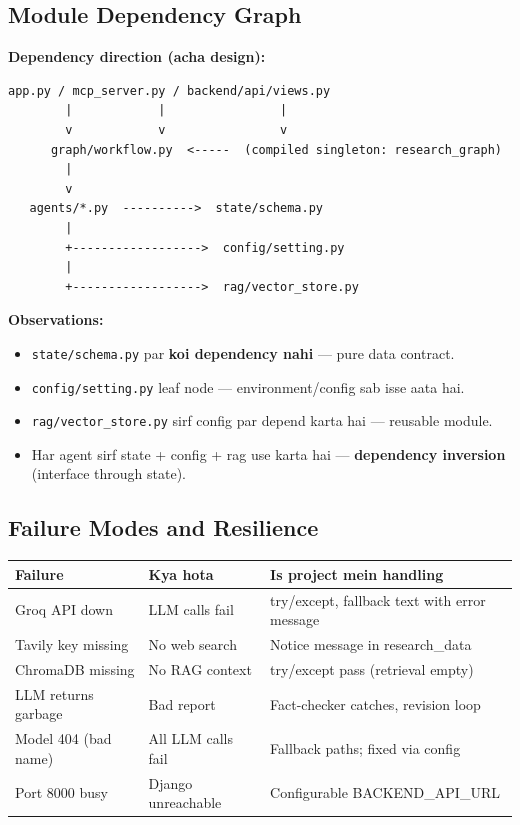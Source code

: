 \subsection{Module Dependency Graph}

\begin{conceptbox}
\textbf{Dependency direction (acha design):}

\begin{lstlisting}[style=envstyle]
app.py / mcp_server.py / backend/api/views.py
        |            |                |
        v            v                v
      graph/workflow.py  <-----  (compiled singleton: research_graph)
        |
        v
   agents/*.py  ---------->  state/schema.py
        |
        +------------------>  config/setting.py
        |
        +------------------>  rag/vector_store.py
\end{lstlisting}

\textbf{Observations:}
\begin{itemize}
\item \texttt{state/schema.py} par \textbf{koi dependency nahi} --- pure data contract.
\item \texttt{config/setting.py} leaf node --- environment/config sab isse aata hai.
\item \texttt{rag/vector\_store.py} sirf config par depend karta hai --- reusable module.
\item Har agent sirf state + config + rag use karta hai --- \textbf{dependency inversion} (interface through state).
\end{itemize}
\end{conceptbox}

\subsection{Failure Modes and Resilience}

\begin{longtable}{p{4.2cm} p{4.2cm} p{5.2cm}}
\toprule
\textbf{Failure} & \textbf{Kya hota} & \textbf{Is project mein handling} \\
\midrule
Groq API down & LLM calls fail & try/except, fallback text with error message \\
Tavily key missing & No web search & Notice message in research\_data \\
ChromaDB missing & No RAG context & try/except pass (retrieval empty) \\
LLM returns garbage & Bad report & Fact-checker catches, revision loop \\
Model 404 (bad name) & All LLM calls fail & Fallback paths; fixed via config \\
Port 8000 busy & Django unreachable & Configurable BACKEND\_API\_URL \\
\bottomrule
\end{longtable}

